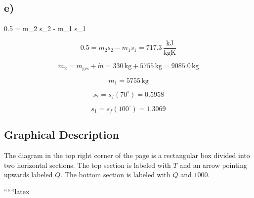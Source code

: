 

\subsection*{e)}
0.5 = m_2 s_2 - m_1 s_1

\[
0.5 = m_2 s_2 - m_1 s_1 = 717.3 \, \frac{\text{kJ}}{\text{kgK}}
\]

\[
m_2 = m_{\text{ges}} + \dot{m} = 330 \, \text{kg} + 5755 \, \text{kg} = 9085.0 \, \text{kg}
\]

\[
m_1 = 5755 \, \text{kg}
\]

\[
s_2 = s_f (70^\circ) = 0.5958
\]

\[
s_1 = s_f (100^\circ) = 1.3069
\]

\subsection*{Graphical Description}
The diagram in the top right corner of the page is a rectangular box divided into two horizontal sections. The top section is labeled with \( T \) and an arrow pointing upwards labeled \( Q \). The bottom section is labeled with \( Q \) and \( 1000 \).

``````latex